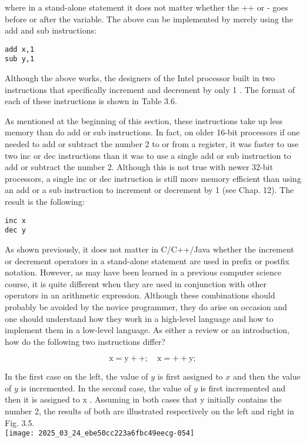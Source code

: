 \documentclass[10pt]{article}
\begin{document}
where in a stand-alone statement it does not matter whether the ++ or - goes before or after the variable. The above can be implemented by merely using the add and sub instructions:

\begin{verbatim}
add x,1
sub y,1
\end{verbatim}

Although the above works, the designers of the Intel processor built in two instructions that specifically increment and decrement by only 1 . The format of each of these instructions is shown in Table 3.6.

As mentioned at the beginning of this section, these instructions take up less memory than do add or sub instructions. In fact, on older 16-bit processors if one needed to add or subtract the number 2 to or from a register, it was faster to use two inc or dec instructions than it was to use a single add or sub instruction to add or subtract the number 2. Although this is not true with newer 32-bit processors, a single inc or dec instruction is still more memory efficient than using an add or a sub instruction to increment or decrement by 1 (see Chap. 12). The result is the following:

\begin{verbatim}
inc x
dec y
\end{verbatim}

As shown previously, it does not matter in C/C++/Java whether the increment or decrement operators in a stand-alone statement are used in prefix or postfix notation. However, as may have been learned in a previous computer science course, it is quite different when they are used in conjunction with other operators in an arithmetic expression. Although these combinations should probably be avoided by the novice programmer, they do arise on occasion and one should understand how they work in a high-level language and how to implement them in a low-level language. As either a review or an introduction, how do the following two instructions differ?

$$
\mathrm{x}=\mathrm{y}++; \quad \mathrm{x}=++\mathrm{y} ;
$$

In the first case on the left, the value of $y$ is first assigned to $x$ and then the value of $y$ is incremented. In the second case, the value of $y$ is first incremented and then it is assigned to x . Assuming in both cases that y initially contains the number 2, the results of both are illustrated respectively on the left and right in Fig. 3.5.\\
\texttt{[image: 2025\_03\_24\_ebe50cc223a6fbc49eecg-054]}
\end{document}
